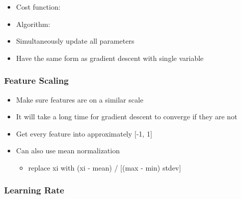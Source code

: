 \documentclass[]{article}
\providecommand{\tightlist}{%
  \setlength{\itemsep}{0pt}\setlength{\parskip}{0pt}}
\begin{document}
\begin{itemize}
\tightlist
\item
  Cost function:
\end{itemize}

\begin{itemize}
\tightlist
\item
  Algorithm:
\end{itemize}

\begin{itemize}
\tightlist
\item
  Simultaneously update all parameters
\item
  Have the same form as gradient descent with single variable
\end{itemize}

\hypertarget{feature-scaling}{%
\subsubsection{Feature Scaling}\label{feature-scaling}}

\begin{itemize}
\tightlist
\item
  Make sure features are on a similar scale
\item
  It will take a long time for gradient descent to converge if they are
  not
\item
  Get every feature into approximately {[}-1, 1{]}
\item
  Can also use mean normalization

  \begin{itemize}
  \tightlist
  \item
    replace xi with (xi - mean) / {[}(max - min) \textbar{} stdev{]}
  \end{itemize}
\end{itemize}

\hypertarget{learning-rate}{%
\subsubsection{Learning Rate}\label{learning-rate}}
\end{document}
